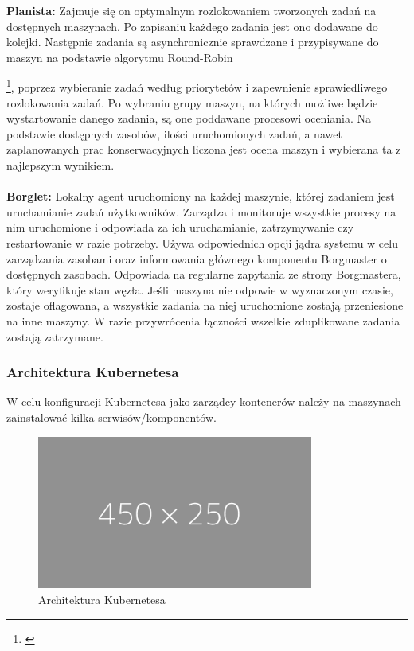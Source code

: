 \documentclass[12pt]{report}
\let\Oldsubsubsection\subsubsection
\renewcommand{\subsubsection}{\FloatBarrier\Oldsubsubsection}
\begin{document}
{\bf Planista:} Zajmuje się on optymalnym rozlokowaniem tworzonych zadań na dostępnych maszynach. Po zapisaniu każdego zadania jest ono dodawane do kolejki. Następnie zadania są asynchronicznie sprawdzane i przypisywane do maszyn na podstawie algorytmu Round-Robin{\footnote{\cite{}}, poprzez wybieranie zadań według priorytetów i zapewnienie sprawiedliwego rozlokowania zadań. Po wybraniu grupy maszyn, na których możliwe będzie wystartowanie danego zadania, są one poddawane procesowi oceniania. Na podstawie dostępnych zasobów, ilości uruchomionych zadań, a nawet zaplanowanych prac konserwacyjnych liczona jest ocena maszyn i wybierana ta z najlepszym wynikiem. \\ \\
{\bf Borglet:} Lokalny agent uruchomiony na każdej maszynie, której zadaniem jest uruchamianie zadań użytkowników. Zarządza i monitoruje wszystkie procesy na nim uruchomione i odpowiada za ich uruchamianie, zatrzymywanie czy restartowanie w razie potrzeby. Używa odpowiednich opcji jądra systemu w celu zarządzania zasobami oraz informowania głównego komponentu Borgmaster o dostępnych zasobach. Odpowiada na regularne zapytania ze strony Borgmastera, który weryfikuje stan węzła. Jeśli maszyna nie odpowie w wyznaczonym czasie, zostaje oflagowana, a wszystkie zadania na niej uruchomione zostają przeniesione na inne maszyny. W razie przywrócenia łączności wszelkie zduplikowane zadania zostają zatrzymane.

\subsubsection{Architektura Kubernetesa}

W celu konfiguracji Kubernetesa jako zarządcy kontenerów należy na maszynach zainstalować kilka serwisów/komponentów.

\begin{figure}[h]
	\centering
	\includegraphics[width=0.81\textwidth]{images/placeholder-wide.png}
	\caption{Architektura Kubernetesa}
\end{figure}

}
\end{document}
